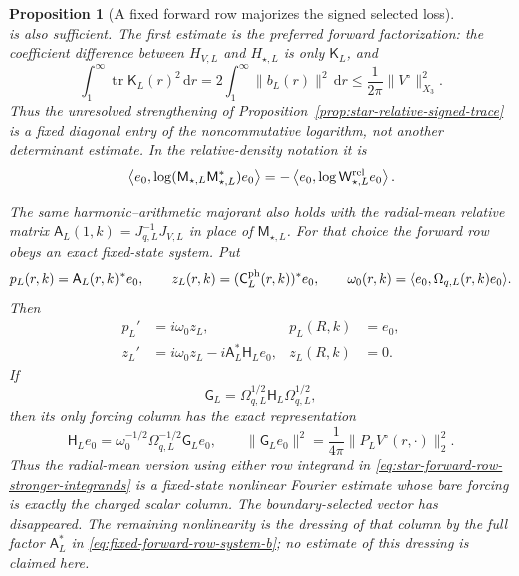 \documentclass[11pt]{article}
\newcommand{\dd}{\,\mathrm d}
\newtheorem{proposition}[theorem]{Proposition}
\theoremstyle{definition}
\theoremstyle{remark}
\begin{document}
\begin{proposition}[A fixed forward row majorizes the signed selected loss]
\begin{equation}
\end{equation}
is also sufficient.  The first estimate is the preferred forward
factorization:
the coefficient difference between $H_{V,L}$ and $H_{\star,L}$ is only
$\mathsf K_L$, and
\begin{equation}
 \int_1^\infty\operatorname{tr}\mathsf K_L(r)^2\dd r
 =2\int_1^\infty\|b_L(r)\|^2\dd r
 \leq\frac1{2\pi}\|V^\circ\|_{X_3}^2.
 \label{eq:star-forward-row-charged-coefficient}
\end{equation}
Thus the unresolved strengthening of
Proposition~\ref{prop:star-relative-signed-trace} is a fixed diagonal entry of
the noncommutative logarithm, not another determinant estimate.  In the
relative-density notation it is
\begin{equation}
 \left\langle e_0,
  \log(\mathsf M_{\star,L}\mathsf M_{\star,L}^*)e_0\right\rangle
 =-\left\langle e_0,
  \log\mathsf W_{\star,L}^{\rm rel}e_0\right\rangle.
 \label{eq:star-diagonal-quantum-entropy}
\end{equation}

The same harmonic--arithmetic majorant also holds with the radial-mean
relative matrix $\mathsf A_L(1,k)=J_{q,L}^{-1}J_{V,L}$ in place of
$\mathsf M_{\star,L}$.  For that choice the forward row obeys an exact
fixed-state system.  Put
\begin{equation}
 p_L(r,k)=\mathsf A_L(r,k)^*e_0,
 \qquad
 z_L(r,k)=(\mathsf C_L^{\rm ph}(r,k))^*e_0,
 \qquad
 \omega_0(r,k)=\langle e_0,\Omega_{q,L}(r,k)e_0\rangle.
 \label{eq:fixed-forward-row-state}
\end{equation}
Then
\begin{align}
 p_L'&=i\omega_0 z_L,
 &p_L(R,k)&=e_0,
 \label{eq:fixed-forward-row-system-a}\\
 z_L'&=i\omega_0z_L-i\mathsf A_L^*\mathsf H_Le_0,
 &z_L(R,k)&=0.
 \label{eq:fixed-forward-row-system-b}
\end{align}
If
\begin{equation}
 \mathsf G_L=\Omega_{q,L}^{1/2}\mathsf H_L
                  \Omega_{q,L}^{1/2},
\end{equation}
then its only forcing column has the exact representation
\begin{equation}
 \mathsf H_Le_0
 =\omega_0^{-1/2}\Omega_{q,L}^{-1/2}\mathsf G_Le_0,
 \qquad
 \|\mathsf G_Le_0\|^2
 =\frac1{4\pi}\|P_LV^\circ(r,\cdot)\|_2^2.
 \label{eq:fixed-forward-row-balanced-forcing}
\end{equation}
Thus the radial-mean version using either row integrand in
\eqref{eq:star-forward-row-stronger-integrands} is a fixed-state nonlinear
Fourier estimate whose bare forcing is exactly the charged scalar column.
The boundary-selected vector has disappeared.  The remaining nonlinearity is
the dressing of that column by the full factor $\mathsf A_L^*$ in
\eqref{eq:fixed-forward-row-system-b}; no estimate of this dressing is claimed
here.
\end{proposition}
\end{document}
